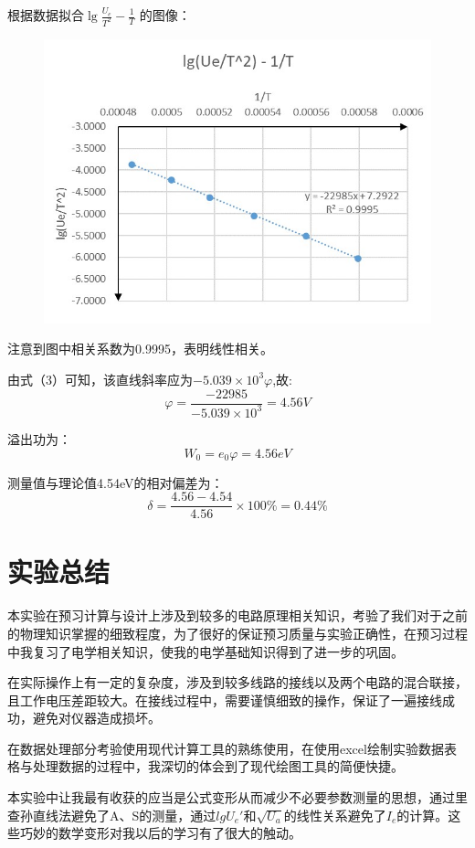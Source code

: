 \documentclass[UTF8]{ctexart}
\begin{document}
根据数据拟合$\lg \frac{U_{e}}{T^2}-\frac{1}{T}$ 的图像：
\begin{figure}[H]
  \centering
  \includegraphics[scale=0.9]{图2.jpg}
\end{figure}
注意到图中相关系数为0.9995，表明线性相关。

由式（3）可知，该直线斜率应为$-5.039 \times 10^{3} \varphi$,故:
$$
\varphi=\frac{-22985}{-5.039 \times 10^{3}}=4.56V
$$

溢出功为：
$$
W_0=e_0\varphi=4.56eV
$$

测量值与理论值4.54eV的相对偏差为：
$$
\delta=\frac{4.56-4.54}{4.56}\times 100\% =0.44\%
$$
\section{实验总结}

本实验在预习计算与设计上涉及到较多的电路原理相关知识，考验了我们对于之前的物理知识掌握的细致程度，为了很好的保证预习质量与实验正确性，在预习过程中我复习了电学相关知识，使我的电学基础知识得到了进一步的巩固。

在实际操作上有一定的复杂度，涉及到较多线路的接线以及两个电路的混合联接，且工作电压差距较大。在接线过程中，需要谨慎细致的操作，保证了一遍接线成功，避免对仪器造成损坏。

在数据处理部分考验使用现代计算工具的熟练使用，在使用excel绘制实验数据表格与处理数据的过程中，我深切的体会到了现代绘图工具的简便快捷。

本实验中让我最有收获的应当是公式变形从而减少不必要参数测量的思想，通过里查孙直线法避免了A、S的测量，通过$lg U_e'$和$\sqrt{U_a}$的线性关系避免了$I_e$的计算。这些巧妙的数学变形对我以后的学习有了很大的触动。
\end{document}
